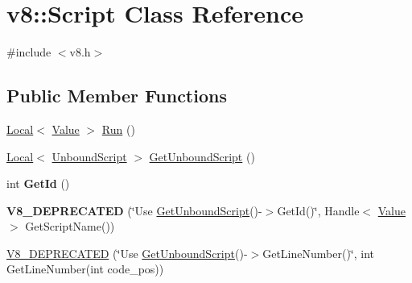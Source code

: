 \hypertarget{classv8_1_1Script}{\section{v8\-:\-:Script Class Reference}
\label{classv8_1_1Script}
}


{\ttfamily \#include $<$v8.\-h$>$}

\subsection*{Public Member Functions}
\begin{DoxyCompactItemize}
\item 
\hyperlink{classv8_1_1Local}{Local}$<$ \hyperlink{classv8_1_1Value}{Value} $>$ \hyperlink{classv8_1_1Script_a5f43b29d40bd51ebad2cc275ba3898a1}{Run} ()
\item 
\hyperlink{classv8_1_1Local}{Local}$<$ \hyperlink{classv8_1_1UnboundScript}{Unbound\-Script} $>$ \hyperlink{classv8_1_1Script_afac25cad452a61897c375c2b881e2070}{Get\-Unbound\-Script} ()
\item 
\hypertarget{classv8_1_1Script_aacb1cf3b66a6542b898042689221d3d5}{int {\bfseries Get\-Id} ()}\label{classv8_1_1Script_aacb1cf3b66a6542b898042689221d3d5}

\item 
\hypertarget{classv8_1_1Script_a84ab7096e92a7a4e2b9bf618948acc99}{{\bfseries V8\-\_\-\-D\-E\-P\-R\-E\-C\-A\-T\-E\-D} (\char`\"{}Use \hyperlink{classv8_1_1Script_afac25cad452a61897c375c2b881e2070}{Get\-Unbound\-Script}()-\/$>$Get\-Id()\char`\"{}, Handle$<$ \hyperlink{classv8_1_1Value}{Value} $>$ Get\-Script\-Name())}\label{classv8_1_1Script_a84ab7096e92a7a4e2b9bf618948acc99}

\item 
\hyperlink{classv8_1_1Script_a549f4ed0ded9a3f9d8ffec541d7b5277}{V8\-\_\-\-D\-E\-P\-R\-E\-C\-A\-T\-E\-D} (\char`\"{}Use \hyperlink{classv8_1_1Script_afac25cad452a61897c375c2b881e2070}{Get\-Unbound\-Script}()-\/$>$Get\-Line\-Number()\char`\"{}, int Get\-Line\-Number(int code\-\_\-pos))
\end{DoxyCompactItemize}
